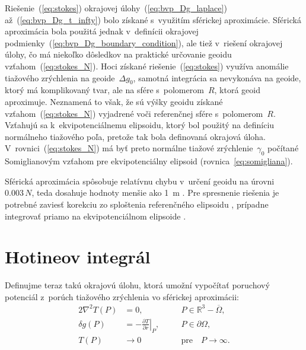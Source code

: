 \documentclass[a4paper, 12pt]{book}
\begin{document}
Riešenie~(\ref{eq:stokes}) okrajovej úlohy~(\ref{eq:bvp_Dg_laplace}) 
až~(\ref{eq:bvp_Dg_t_infty}) bolo získané s~využitím sférickej aproximácie.  
Sférická aproximácia bola použitá jednak v~definícii okrajovej 
podmienky~(\ref{eq:bvp_Dg_boundary_condition}), ale tiež v~riešení okrajovej 
úlohy, čo má niekoľko dôsledkov na praktické určovanie geoidu 
vzťahom~(\ref{eq:stokes_N}).  Hoci získané riešenie~(\ref{eq:stokes}) využíva 
anomálie tiažového zrýchlenia na geoide~$\Delta g_0$, samotná integrácia sa 
nevykonáva na geoide, ktorý má komplikovaný tvar, ale na sfére s~polomerom~$R$, 
ktorá geoid aproximuje.  Neznamená to však, že sú výšky geoidu získané 
vzťahom~(\ref{eq:stokes_N}) vyjadrené voči referenčnej sfére s~polomerom~$R$.  
Vzťahujú sa k~ekvipotenciálnemu elipsoidu, ktorý bol použitý na definíciu 
normálneho tiažového poľa, pretože tak bola definovaná okrajová úloha.  
V~rovnici~(\ref{eq:stokes_N}) má byť preto normálne tiažové 
zrýchlenie~$\gamma_0$ počítané Somiglianovým vzťahom pre ekvipotenciálny 
elipsoid (rovnica~\ref{eq:somigliana}).

Sférická aproximácia spôsobuje relatívnu chybu v~určení geoidu na úrovni~$0.003 
\, N$, teda dosahuje hodnoty menšie ako 1~m \parencite{MoritzPhysicalGeodesy}.  
Pre spresnenie riešenia je potrebné zaviesť korekciu zo sploštenia referenčného 
elipsoidu \parencite{Claessens2006}, prípadne integrovať priamo na 
ekvipotenciálnom elipsoide \parencite{Martinec1997}.


\section{Hotineov integrál}
\label{sec:hotine_integral}

Definujme teraz takú okrajovú úlohu, ktorá umožní vypočítať poruchový potenciál 
z~porúch tiažového zrýchlenia vo sférickej aproximácii:
%
\begin{alignat}{2}
\nabla^2 T(P) &= 0{,} &&P \in \mathbb{R}^3 
- \overline\Omega{,}\label{eq:bvp_dg_laplace}\\
\delta g(P) &= -\left.\frac{\partial T}{\partial r}\right|_P{,} \quad &&P \in 
\partial\Omega{,}\label{eq:bvp_dg_boundary_condition}\\
T(P) &\rightarrow 0 &&\textrm{pre} \quad P \rightarrow 
\infty{.}\label{eq:bvp_dg_t_infty}
\end{alignat}
\end{document}

